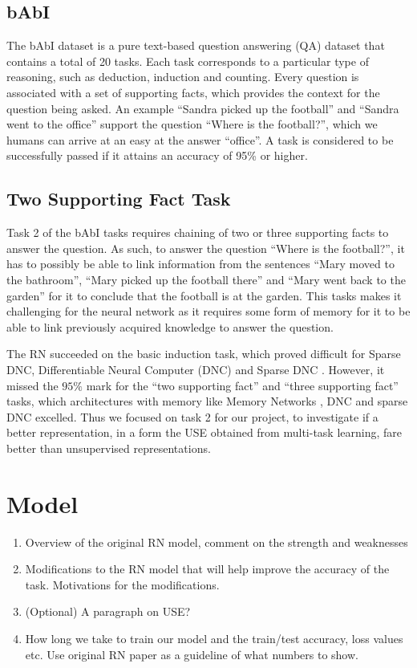 \documentclass{article}
\begin{document}
\subsection{bAbI}
The bAbI dataset is a pure text-based question answering (QA) dataset that contains a total of 20 tasks. Each task corresponds to a particular type of reasoning, such as deduction, induction and counting. Every question is associated with a set of supporting facts, which provides the context for the question being asked. An example ``Sandra picked up the football'' and ``Sandra went to the office'' support the question ``Where is the football?'', which we humans can arrive at an easy at the answer ``office''. A task is considered to be successfully passed if it attains an accuracy of 95\% or higher.


\subsection{Two Supporting Fact Task}
Task 2 of the bAbI tasks requires chaining of two or three supporting facts to answer the question. As such, to answer the question ``Where is the football?'', it has to possibly be able to link information from the sentences ``Mary moved to the bathroom'', ``Mary picked up the football there'' and ``Mary went back to the garden'' for it to conclude that the football is at the garden. This tasks makes it challenging for the neural network as it requires some form of memory for it to be able to link previously acquired knowledge to answer the question. 

The RN succeeded on the basic induction task, which proved difficult for Sparse DNC, Differentiable Neural Computer (DNC) \cite{Graves2016} and Sparse DNC \cite{Rae2016}. However, it missed the $95\%$ mark for the ``two supporting fact'' and ``three supporting fact'' tasks, which architectures with memory like Memory Networks \cite{Weston2015a}, DNC and sparse DNC excelled. Thus we focused on task 2 for our project, to investigate if a better representation, in a form the USE obtained from multi-task learning, fare better than unsupervised representations.




\section{Model}
\begin{enumerate}
\item Overview of the original RN model, comment on the strength and weaknesses
\item Modifications to the RN model that will help improve the accuracy of the task. Motivations for the modifications.
\item (Optional) A paragraph on USE?

\item How long we take to train our model and the train/test accuracy, loss values etc. Use original RN paper as a guideline of what numbers to show.
\end{enumerate}
\end{document}
